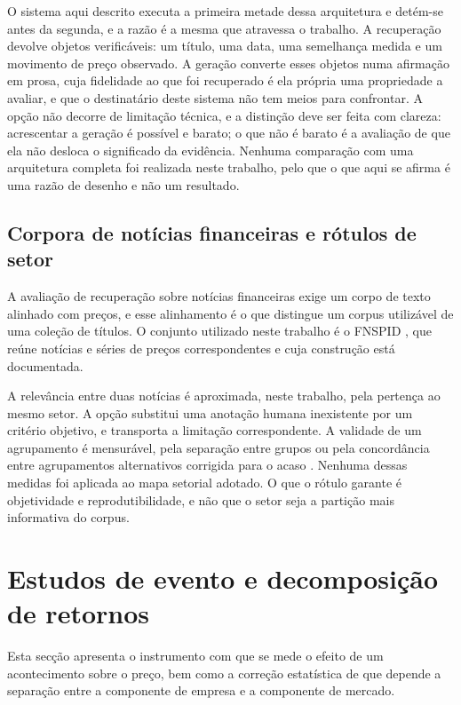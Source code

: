 O sistema aqui descrito executa a primeira metade dessa arquitetura e detém-se antes da segunda, e a
razão é a mesma que atravessa o trabalho. A recuperação devolve objetos verificáveis: um título, uma
data, uma semelhança medida e um movimento de preço observado. A geração converte esses objetos numa
afirmação em prosa, cuja fidelidade ao que foi recuperado é ela própria uma propriedade a avaliar, e
que o destinatário deste sistema não tem meios para confrontar. A opção não decorre de limitação
técnica, e a distinção deve ser feita com clareza: acrescentar a geração é possível e barato; o que
não é barato é a avaliação de que ela não desloca o significado da evidência. Nenhuma comparação com
uma arquitetura completa foi realizada neste trabalho, pelo que o que aqui se afirma é uma razão de
desenho e não um resultado.

\subsection{Corpora de notícias financeiras e rótulos de setor}

A avaliação de recuperação sobre notícias financeiras exige um corpo de texto alinhado com preços, e
esse alinhamento é o que distingue um corpus utilizável de uma coleção de títulos. O conjunto
utilizado neste trabalho é o \gls{FNSPID} \autocite{dong2024fnspid}, que reúne notícias e séries de
preços correspondentes e cuja construção está documentada.

A relevância entre duas notícias é aproximada, neste trabalho, pela pertença ao mesmo setor. A opção substitui uma anotação humana inexistente por um critério objetivo, e transporta a
limitação correspondente. A validade de um agrupamento é mensurável, pela separação entre grupos
\autocite{rousseeuw1987silhouettes} ou pela concordância entre agrupamentos alternativos corrigida
para o acaso \autocite{vinh2010ami}. Nenhuma dessas medidas foi aplicada ao mapa setorial adotado. O que o rótulo garante é objetividade e reprodutibilidade, e não que o setor seja
a partição mais informativa do corpus.

\section{Estudos de evento e decomposição de retornos}
\label{sec:ctx_evento}

Esta secção apresenta o instrumento com que se mede o efeito de um acontecimento sobre o preço, bem
como a correção estatística de que depende a separação entre a componente de empresa e a componente
de mercado.

